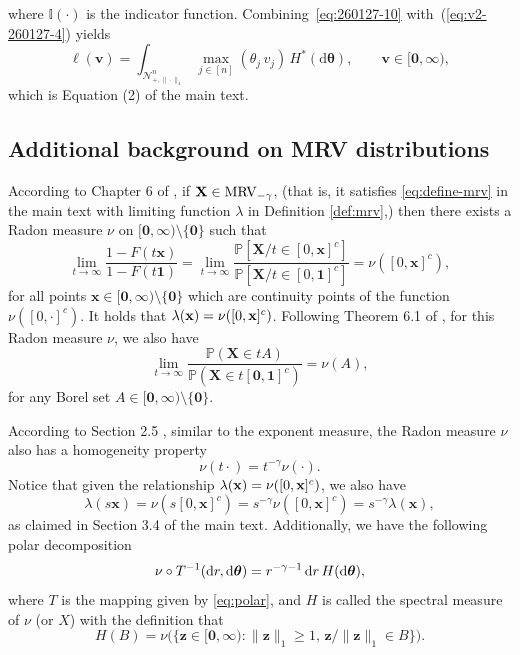 \documentclass[12pt]{article}
\theoremstyle{plain}
\theoremstyle{plain}
\theoremstyle{definition}
\renewcommand{\Pr}{\mathbb{P}}
\newcommand{\punitsphereone}[1]{\mathcal{N}_{+,\|\cdot\|_1}^{#1}}
\begin{document}
where $\mathbb{I}(\cdot)$ is the indicator function.
Combining~\eqref{eq:260127-10} with~(\ref{eq:v2-260127-4}) yields
\[
\ell(\mathbf{v}) 
=\int_{\punitsphereone{n}}
\max_{j\in[n]}
\left(
{\theta_j}  \, v_j
\right)
\, H^*(\mathrm{d}\boldsymbol{\theta}),
\qquad
\mathbf{v}\in[\mathbf{0},\bm{\infty}),
\]
which is Equation (2) of the main text.

\subsection{Additional background on MRV distributions}
\label{subsec:equi-def-mrv}
According to Chapter 6 of \cite{resnick2007heavy}, if ${\bf X}\in {\rm MRV}_{-\gamma}$, (that is, it satisfies \eqref{eq:define-mrv} in the main text with  limiting function $\lambda$ in Definition \ref{def:mrv},) then     there exists a Radon measure $\nu$ on $[\mathbf{0},\bm{\infty})\setminus\{\mathbf{0}\}$ such that
\begin{equation} \label{eq:260205-1}
	\lim_{t\to\infty}
	\frac{1-F(t\mathbf{x})}{1-F(t\mathbf{1})}
	=
	\lim_{t\to\infty}
	\frac{\mathbb{P}\!\left[\mathbf{X}/t \in [0,\mathbf{x}]^{c}\right]}
	{\mathbb{P}\!\left[\mathbf{X}/t \in [0,\mathbf{1}]^{c}\right]}
	=
	\nu\!\left([0,\mathbf{x}]^{c}\right),
\end{equation}
for all points $\mathbf{x}\in[\mathbf{0},\bm{\infty})\setminus\{\mathbf{0}\}$ which are continuity points of the function $\nu([0,\cdot]^{c})$. 
It holds that  $\lambda({\bf x})=\nu\!\left([0,\mathbf{x}]^{c}\right)$. 
Following Theorem 6.1 of , for this Radon measure $\nu$, we also have
\begin{equation}
	\label{eq:nu-borel-set}
	\lim_{t\to\infty}\frac{\Pr\left(\mathbf X\in tA\right)}{\Pr\left(\mathbf X\in t[\mathbf 0,\mathbf 1]^c\right)}
	=\nu(A), 
\end{equation}
for any Borel set $A\in[\mathbf{0},\bm{\infty}) \setminus \{\mathbf{0}\}$.

According to Section 2.5 \cite{resnick2008multivariate}, similar to the exponent measure, the Radon measure $\nu$ also has a homogeneity property
\[
\nu(t\cdot)=t^{-\gamma}\nu(\cdot).
\]
Notice that given the relationship $\lambda({\bf x})=\nu\!\left([0,\mathbf{x}]^{c}\right)$, we also have 
\[
\lambda(s\mathbf{x})=\nu\!\left(s[0,\mathbf{x}]^{c}\right) = s^{-\gamma}\nu\!\left([0,\mathbf{x}]^{c}\right) = s^{-\gamma}\lambda(\mathbf{x}), 
\]
as claimed in Section 3.4 of the main text. Additionally, we have the following polar decomposition
\[
\nu\circ T^{-1}({\rm d}r,{\rm d}\boldsymbol{\theta})
=
r^{-\gamma-1}\,{\rm d}r\,H({\rm d}\boldsymbol{\theta}),
\]
where $T$ is the mapping given by \eqref{eq:polar}, and $H$ is called the spectral measure of $\nu$ (or $X$) with the definition that
\[
H(B)
=
\nu\bigl(\{\mathbf{z}\in[\mathbf{0},\bm{\infty}):\|\mathbf{z}\|_1\ge1,\,
\mathbf{z}/\|\mathbf{z}\|_1\in B\}\bigr).
\]
\end{document}
